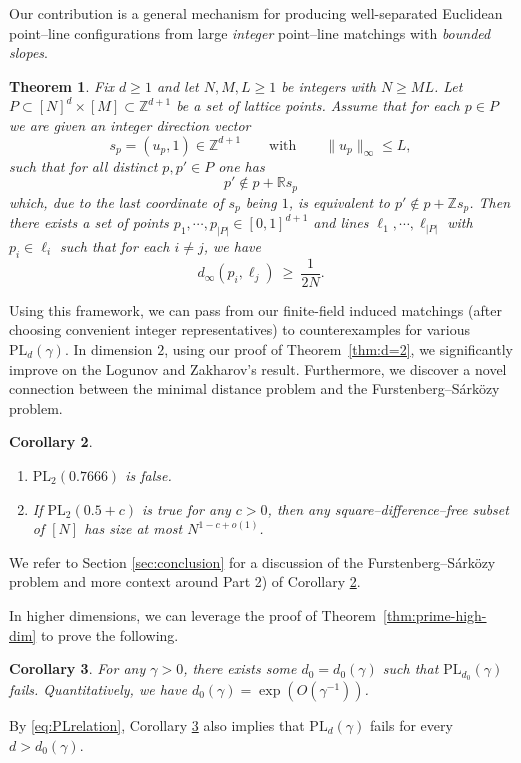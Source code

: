 \documentclass[12pt,reqno]{amsart}
\theoremstyle{plain}
\newtheorem{theorem}{Theorem}[section]
\newtheorem{corollary}[theorem]{Corollary}
\theoremstyle{definition}
\newcommand{\PL}{\mathrm{PL}}
\newcommand{\1}{\mathbf{1}}
\begin{document}
\medskip

Our contribution is a general mechanism for producing well-separated Euclidean point--line configurations from
large \emph{integer} point--line matchings with \emph{bounded slopes}.
\begin{theorem}
\label{thm:lattice-to-PL}
Fix $d\ge 1$ and let $N,M,L\ge 1$ be integers with $N\ge ML$.
Let $P\subset [N]^d\times [M]\subset \mathbb{Z}^{d+1}$ be a set of lattice points.
Assume that for each $p\in P$ we are given an integer direction vector
\[
  s_p=(u_p,1)\in \mathbb{Z}^{d+1}
  \qquad\text{with}\qquad
  \|u_p\|_\infty\le L,
\]
such that for all distinct $p,p'\in P$ one has
\[
  p'\notin p+\mathbb{R}s_p
\]
which, due to the last coordinate of $s_p$ being $1$, is equivalent to $p'\notin p+\mathbb{Z}s_p$. Then there exists a set of points $p_1, \cdots, p_{|P|} \in [0, 1]^{d + 1}$ and lines $\ell_1, \cdots, \ell_{|P|}$ with $p_i \in \ell_i$ such that for each $i \neq j$, we have
\[
  d_\infty(p_i, \ell_j)\ \ge\ \frac{1}{2N}.
\]
\end{theorem}
Using this framework, we can pass from our finite-field induced matchings (after choosing convenient integer representatives)
to counterexamples for various $\PL_d(\gamma)$. In dimension $2$, using our proof of Theorem~\ref{thm:d=2}, we significantly improve on the Logunov and Zakharov's result. Furthermore, we discover a novel connection between the minimal distance problem and the Furstenberg--S\'{a}rk\"{o}zy problem.

\begin{corollary}
\label{cor:PL2}
\begin{enumerate}
\item $\PL_2(0.7666)$ is false.

\item If $\PL_2(0.5 + c)$ is true for any $c > 0$, then any square--difference--free subset of $[N]$ has size at most $N^{1 - c + o(1)}$.
\end{enumerate}
\end{corollary}

We refer to Section \ref{sec:conclusion} for a discussion of the Furstenberg--S\'{a}rk\"{o}zy problem and more context around Part 2) of Corollary \ref{cor:PL2}.

In higher dimensions, we can leverage the proof of Theorem~\ref{thm:prime-high-dim} to prove the following. 
\begin{corollary}
    \label{cor:PLd}
    For any $\gamma > 0$, there exists some $d_0=d_0(\gamma) $ such that $\PL_{d_0}(\gamma)$ fails. Quantitatively, we have $d_0(\gamma) = \exp(O(\gamma^{-1}))$.
\end{corollary}
By \eqref{eq:PLrelation}, Corollary \ref{cor:PLd} also implies that $\PL_d(\gamma)$ fails for every $d>d_0(\gamma)$.
\end{document}
